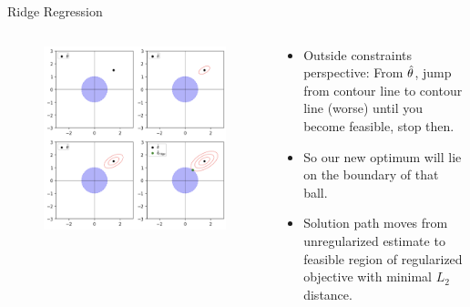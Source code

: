 \documentclass[11pt,compress,t,notes=noshow, xcolor=table]{beamer}
\begin{document}
\begin{vbframe}{Ridge Regression}
\framebreak

\begin{columns}
\begin{column}{0.5\textwidth}
\lz
\begin{figure}
\includegraphics[width=\textwidth]{figure/ridge_outside.png}
\end{figure}
\end{column}

\begin{column}{0.5\textwidth}
\begin{footnotesize} 
\begin{itemize}

	\item Outside constraints perspective: From $\hat{\theta}$, jump from contour line to contour line (worse) until you become feasible, stop then.
  \item So our new optimum will lie on the boundary of that ball.
  \item Solution path moves from unregularized estimate to feasible region of regularized objective with minimal $L_2$ distance.
\end{itemize}
\end{footnotesize}
\end{column}
\end{columns}


\end{vbframe}
\end{document}
